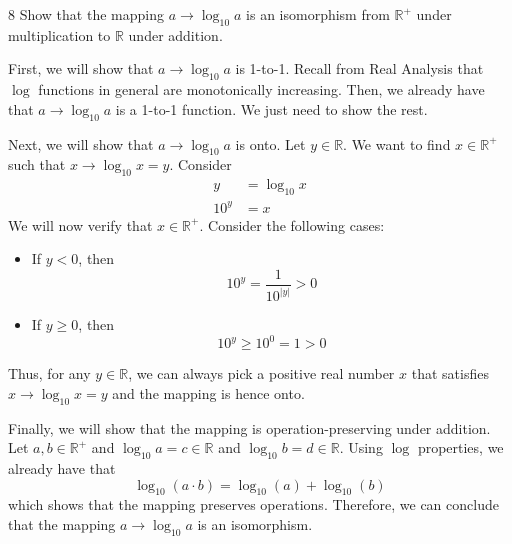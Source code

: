 \newpage
\begin{hwproblem}
{8}{
    Show that the mapping \(a \to \log_{10} a\) is an isomorphism from \(\mathbb{R}^+\) under multiplication to \(\mathbb{R}\) under addition.
}

First, we will show that \(a \to \log_{10} a\) is 1-to-1. Recall from Real Analysis that \(\log\) functions in general are monotonically increasing. Then, we already have that \(a \to \log_{10}a\) is a 1-to-1 function. We just need to show the rest.

Next, we will show that \(a \to \log_{10} a\) is onto. Let \(y \in \mathbb{R}\). We want to find \(x \in \mathbb{R}^+\) such that \(x \to \log_{10}x = y\). Consider
\[
\begin{aligned}
    y &= \log_{10} x \\
    10^y &= x
\end{aligned}
\]
We will now verify that \(x \in \mathbb{R}^+\). Consider the following cases:
\begin{itemize}
    \item If \(y < 0\), then 
        \[
            10^y = \frac{1}{10^{|y|}} > 0
        \]
    \item If \(y \geq 0\), then
        \[
            10^y \geq 10^0 = 1 > 0
        \]
\end{itemize}
Thus, for any \(y \in \mathbb{R}\), we can always pick a positive real number \(x\) that satisfies \(x \to \log_{10} x = y\) and the mapping is hence onto.

Finally, we will show that the mapping is operation-preserving under addition. Let \(a, b \in \mathbb{R}^+\) and \(\log_{10}a = c \in \mathbb{R}\) and \(\log_{10}b = d \in \mathbb{R}\). Using \(\log\) properties, we already have that
\[
    \log_{10}(a \cdot b) = \log_{10}(a) + \log_{10}(b)
\]
which shows that the mapping preserves operations. Therefore, we can conclude that the mapping \(a \to \log_{10} a\) is an isomorphism.
\end{hwproblem}

